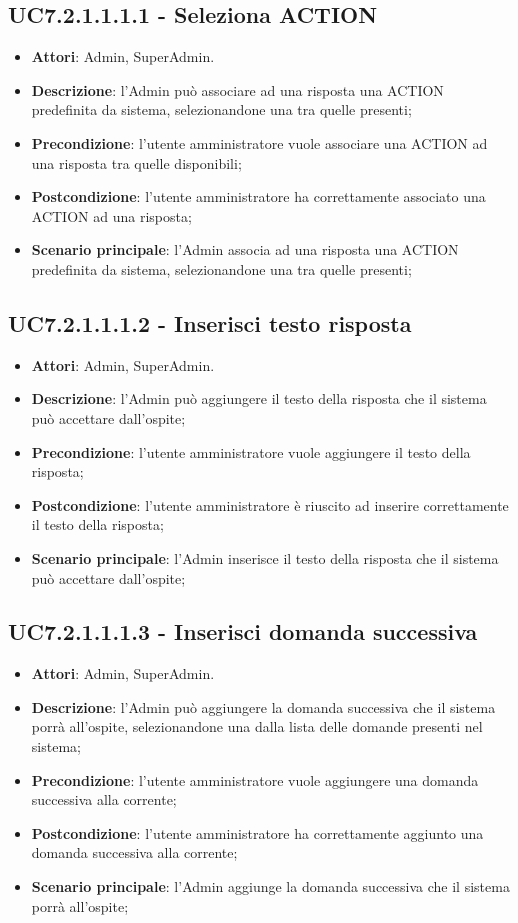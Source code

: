 \documentclass[../AnalisiDeiRequisiti_v4.0.0.tex]{subfiles}
\begin{document}
\begin{itemize}
\subsection{UC7.2.1.1.1.1 - Seleziona ACTION} 
\label{sssec:UC7.2.1.1.1.1} 
\begin{itemize} 
\item \textbf{Attori}: Admin, SuperAdmin.
\item \textbf{Descrizione}: l'Admin può associare ad una risposta una ACTION predefinita da sistema, selezionandone una tra quelle presenti;
\item \textbf{Precondizione}: l'utente amministratore vuole associare una ACTION ad una risposta tra quelle disponibili;
\item \textbf{Postcondizione}: l'utente amministratore ha correttamente associato una ACTION ad una risposta;\item \textbf{Scenario principale}: l'Admin associa ad una risposta una ACTION predefinita da sistema, selezionandone una tra quelle presenti;
\end{itemize} 
\subsection{UC7.2.1.1.1.2 - Inserisci testo risposta} 
\label{sssec:UC7.2.1.1.1.2} 
\begin{itemize} 
\item \textbf{Attori}: Admin, SuperAdmin.
\item \textbf{Descrizione}: l'Admin può aggiungere il testo della risposta che il sistema può accettare dall'ospite;
\item \textbf{Precondizione}: l'utente amministratore vuole aggiungere il testo della risposta;
\item \textbf{Postcondizione}: l'utente amministratore è riuscito ad inserire correttamente il testo della risposta;
\item \textbf{Scenario principale}: l'Admin inserisce il testo della risposta che il sistema può accettare dall'ospite;
\end{itemize} 
\subsection{UC7.2.1.1.1.3 - Inserisci domanda successiva} 
\label{sssec:UC7.2.1.1.1.2} 
\begin{itemize} 
\item \textbf{Attori}: Admin, SuperAdmin.
\item \textbf{Descrizione}: l'Admin può aggiungere la domanda successiva che il sistema porrà all'ospite, selezionandone una dalla lista delle domande presenti nel sistema;
\item \textbf{Precondizione}: l'utente amministratore vuole aggiungere una domanda successiva alla corrente;
\item \textbf{Postcondizione}: l'utente amministratore ha correttamente aggiunto una domanda successiva alla corrente;
\item \textbf{Scenario principale}: l'Admin aggiunge la domanda successiva che il sistema porrà all'ospite;
\end{itemize} 
\newpage

\end{itemize}
\end{document}
